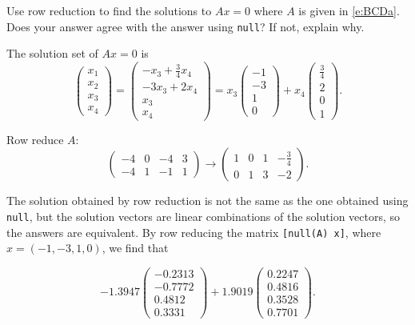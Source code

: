 \documentclass{ximera}
\begin{document}
\begin{computerExercise} \label{c5.3.3}
Use row reduction to find the solutions to $Ax=0$ where $A$ is
given in \eqref{e:BCDa}.  Does your answer agree with the \Matlab
answer using {\tt null}?  If not, explain why.

\begin{solution}

\ans The solution set of $Ax = 0$ is
\[
\left(\begin{array}{r} x_1 \\ x_2 \\ x_3 \\ x_4 \end{array}\right)
= \left(\begin{array}{c} -x_3 + \frac{3}{4}x_4 \\ -3x_3 + 2x_4 \\
x_3 \\ x_4 \end{array}\right) = x_3\left(\begin{array}{r} -1 \\ -3 \\
1 \\ 0 \end{array}\right) + x_4\left(\begin{array}{r} \frac{3}{4} \\
2 \\ 0 \\ 1 \end{array}\right).
\]

\soln Row reduce $A$:
\[
\left(\begin{array}{rrrr} -4 & 0 & -4 & 3 \\ -4 & 1 & -1 & 1
\end{array}\right) \longrightarrow \left(\begin{array}{rrrr}
1 & 0 & 1 & -\frac{3}{4} \\ 0 & 1 & 3 & -2 \end{array}\right).
\]

The solution obtained by row reduction is not the same as the one
obtained using {\tt null}, but the solution vectors are linear
combinations of the \Matlab solution vectors, so the answers are
equivalent.  By row reducing the matrix {\tt [null(A) x]}, where
$x = (-1,-3,1,0)$, we find that

\[
-1.3947\left(\begin{array}{r} -0.2313 \\ -0.7772 \\ 0.4812 \\ 0.3331 \end{array}\right) +
1.9019\left(\begin{array}{r} 0.2247 \\ 0.4816 \\ 0.3528 \\ 0.7701 \end{array}\right).
\]


\end{solution}
\end{computerExercise}
\end{document}
